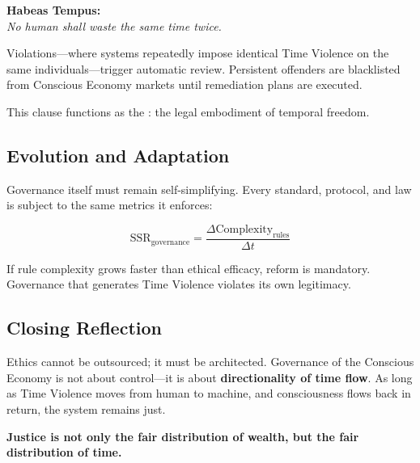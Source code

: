 \begin{fundamentallaw}
\textbf{Habeas Tempus:}\\
\textit{No human shall waste the same time twice.}
\end{fundamentallaw}

Violations—where systems repeatedly impose identical Time Violence on the same individuals—trigger automatic review. Persistent offenders are blacklisted from Conscious Economy markets until remediation plans are executed.

This clause functions as the : the legal embodiment of temporal freedom.

\subsection{Evolution and Adaptation}
\label{sec:governance-evolution}

Governance itself must remain self-simplifying. Every standard, protocol, and law is subject to the same metrics it enforces:

\begin{equation}
\label{eq:governance-ssr}
\text{SSR}_{\text{governance}} = \frac{\Delta \text{Complexity}_{\text{rules}}}{\Delta t}
\end{equation}

If rule complexity grows faster than ethical efficacy, reform is mandatory. Governance that generates Time Violence violates its own legitimacy.

\subsection{Closing Reflection}
\label{sec:governance-closing}

Ethics cannot be outsourced; it must be architected. Governance of the Conscious Economy is not about control—it is about \textbf{directionality of time flow}. As long as Time Violence moves from human to machine, and consciousness flows back in return, the system remains just.

\begin{keyproposition}
\textbf{Justice is not only the fair distribution of wealth, but the fair distribution of time.}
\end{keyproposition}
